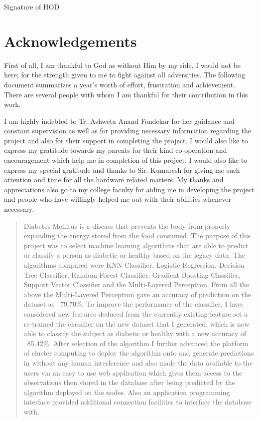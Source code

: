 \documentclass[12pt]{article}
\begin{document}
\begin{flushright}
\vspace{-0.9cm}
Signature of HOD\\
\end{flushright}

\clearpage
\newpage

\section{Acknowledgements}
First of all, I am thankful to God as without Him by my side, I would not be here;
for the strength given to me to fight against all adversities. The following document
summarizes a year’s worth of effort, frustration and achievement. There are several
people with whom I am thankful for their contribution in this work.

I am highly indebted to Tr. Ashweta Anand Fondekar for her guidance and constant supervision as well as for providing necessary information regarding the project and also for their support in completing the project. I would also like to express my gratitude towards my parents for their kind co-operation and encouragement which help me in completion of this project. I would also like to express my special gratitude and thanks to Sir. Kumaresh for giving me such attention and time for all the hardware related matters. My thanks and appreciations also go to my college faculty for aiding me in developing the project and people who have willingly helped me out with their abilities whenever necessary.


\newpage
\tableofcontents
\newpage
\listoffigures
\newpage
\listoftables
\newpage


\begin{abstract}
Diabetes Mellitus is a disease that prevents the body from properly expanding the
energy stored from the food consumed. The purpose of this project was to select
machine learning algorithms that are able to predict or classify a person as diabetic
or healthy based on the legacy data. The algorithms compared were KNN
Classifier, Logistic Regression, Decision Tree Classifier, Random Forest
Classifier, Gradient Boosting Classifier, Support Vector Classifier and the
Multi-Layered Perceptron. From all the above the Multi-Layered Perceptron gave
an accuracy of prediction on the dataset as ~79.70\%. To improve the performance
of the classifier, I have considered new features deduced from the currently
existing feature set a re-trained the classifier on the new dataset that I generated,
which is now able to classify the subject as diabetic or healthy with a new accuracy
of ~85.42\%. After selection of the algorithm I further advanced the platform of cluster computing to
deploy the algorithm onto and generate predictions in without any human
interference​ and also made the data available
to the users via an easy to use web application which gives them access to the
observations then stored in the database after being predicted by the algorithm
deployed on the nodes. Also an application programming interface provided additional connection facilities to interface the database with.
\end{abstract}
\end{document}
